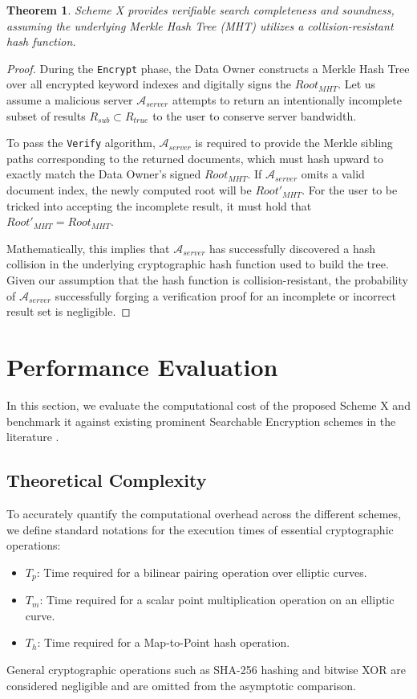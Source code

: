 \documentclass[10pt,journal,compsoc]{IEEEtran}
\newtheorem{theorem}{Theorem}
\begin{document}
\begin{theorem}
Scheme X provides verifiable search completeness and soundness, assuming the underlying Merkle Hash Tree (MHT) utilizes a collision-resistant hash function.
\end{theorem}

\begin{proof}
During the \texttt{Encrypt} phase, the Data Owner constructs a Merkle Hash Tree over all encrypted keyword indexes and digitally signs the $Root_{MHT}$. Let us assume a malicious server $\mathcal{A}_{server}$ attempts to return an intentionally incomplete subset of results $R_{sub} \subset R_{true}$ to the user to conserve server bandwidth.

To pass the \texttt{Verify} algorithm, $\mathcal{A}_{server}$ is required to provide the Merkle sibling paths corresponding to the returned documents, which must hash upward to exactly match the Data Owner's signed $Root_{MHT}$. If $\mathcal{A}_{server}$ omits a valid document index, the newly computed root will be $Root'_{MHT}$. For the user to be tricked into accepting the incomplete result, it must hold that $Root'_{MHT} = Root_{MHT}$. 

Mathematically, this implies that $\mathcal{A}_{server}$ has successfully discovered a hash collision in the underlying cryptographic hash function used to build the tree. Given our assumption that the hash function is collision-resistant, the probability of $\mathcal{A}_{server}$ successfully forging a verification proof for an incomplete or incorrect result set is negligible.
\end{proof}

\section{Performance Evaluation}\label{sec:performance}

In this section, we evaluate the computational cost of the proposed Scheme X and benchmark it against existing prominent Searchable Encryption schemes in the literature \cite{lu2023certificateless, elhabob2020efficient, liu2023pairing}. 

\subsection{Theoretical Complexity}
To accurately quantify the computational overhead across the different schemes, we define standard notations for the execution times of essential cryptographic operations:
\begin{itemize}
    \item $T_p$: Time required for a bilinear pairing operation over elliptic curves.
    \item $T_m$: Time required for a scalar point multiplication operation on an elliptic curve.
    \item $T_h$: Time required for a Map-to-Point hash operation.
\end{itemize}
General cryptographic operations such as SHA-256 hashing and bitwise XOR are considered negligible and are omitted from the asymptotic comparison.
\end{document}
